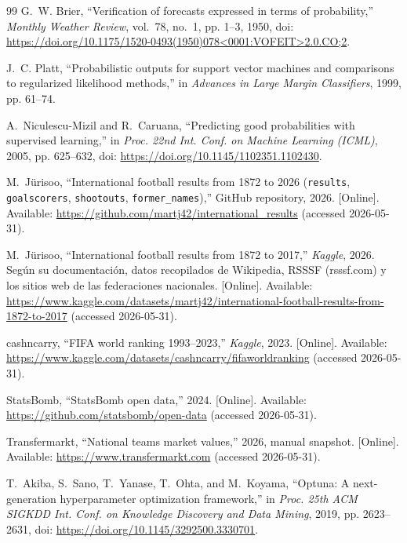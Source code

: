 \documentclass[conference]{IEEEtran}
\begin{document}
\begin{thebibliography}{99}
  G.~W. Brier, ``Verification of forecasts expressed in terms of probability,''
  \emph{Monthly Weather Review}, vol.~78, no.~1, pp. 1--3, 1950, doi:
  \url{https://doi.org/10.1175/1520-0493(1950)078<0001:VOFEIT>2.0.CO;2}.

  J.~C. Platt, ``Probabilistic outputs for support vector machines and
  comparisons to regularized likelihood methods,'' in \emph{Advances in Large
    Margin Classifiers}, 1999, pp. 61--74.

  A.~Niculescu-Mizil and R.~Caruana, ``Predicting good probabilities with
  supervised learning,'' in \emph{Proc. 22nd Int. Conf. on Machine Learning
    (ICML)}, 2005, pp. 625--632, doi:
  \url{https://doi.org/10.1145/1102351.1102430}.

  M.~J\"urisoo, ``International football results from 1872 to 2026
  (\texttt{results}, \texttt{goalscorers}, \texttt{shootouts},
  \texttt{former\_names}),'' GitHub repository, 2026. [Online]. Available:
  \url{https://github.com/martj42/international_results} (accessed 2026-05-31).

  M.~J\"urisoo, ``International football results from 1872 to 2017,''
  \emph{Kaggle}, 2026. Seg\'un su documentaci\'on, datos recopilados de
  Wikipedia, RSSSF (rsssf.com) y los sitios web de las federaciones nacionales.
    [Online]. Available:
  \url{https://www.kaggle.com/datasets/martj42/international-football-results-from-1872-to-2017}
  (accessed 2026-05-31).

  cashncarry, ``{FIFA} world ranking 1993--2023,'' \emph{Kaggle}, 2023.
    [Online]. Available:
  \url{https://www.kaggle.com/datasets/cashncarry/fifaworldranking}
  (accessed 2026-05-31).

  {StatsBomb}, ``{StatsBomb} open data,'' 2024. [Online]. Available:
  \url{https://github.com/statsbomb/open-data} (accessed 2026-05-31).

  {Transfermarkt}, ``National teams market values,'' 2026, manual snapshot.
    [Online]. Available: \url{https://www.transfermarkt.com} (accessed 2026-05-31).

  T.~Akiba, S.~Sano, T.~Yanase, T.~Ohta, and M.~Koyama, ``{Optuna}: A
  next-generation hyperparameter optimization framework,'' in \emph{Proc. 25th
    ACM SIGKDD Int. Conf. on Knowledge Discovery and Data Mining}, 2019, pp.
  2623--2631, doi: \url{https://doi.org/10.1145/3292500.3330701}.


\end{thebibliography}
\end{document}
